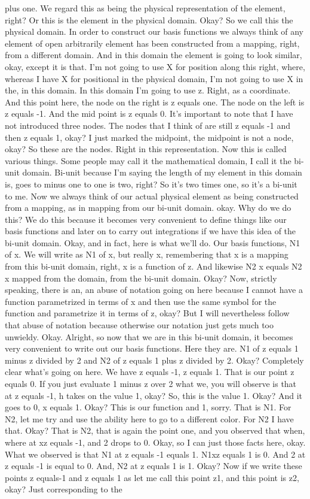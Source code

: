 \documentclass[10pt]{article}
\begin{document}
plus one. We regard this as being the physical representation of the element, right? Or this is the element in the physical domain. Okay? So we call this the physical domain. In order to construct our basis functions we always think of any element of open arbitrarily element has been constructed from a mapping, right, from a different domain. And in this domain the element is going to look similar, okay, except it is that. I'm not going to use X for position along this right, where, whereas I have X for positional in the physical domain, I'm not going to use X in the, in this domain. In this domain I'm going to use z. Right, as a coordinate. And this point here, the node on the right is z equals one. The node on the left is z equals -1. And the mid point is z equals 0. It's important to note that I have not introduced three nodes. The nodes that I think of are still z equals -1 and then z equals 1, okay? I just marked the midpoint, the midpoint is not a node, okay? So these are the nodes. Right in this representation. Now this is called various things. Some people may call it the mathematical domain, I call it the bi-unit domain. Bi-unit because I'm saying the length of my element in this domain is, goes to minus one to one is two, right? So it's two times one, so it's a bi-unit to me. Now we always think of our actual physical element as being constructed from a mapping, as in mapping from our bi-unit domain. okay. Why do we do this? We do this because it becomes very convenient to define things like our basis functions and later on to carry out integrations if we have this idea of the bi-unit domain. Okay, and in fact, here is what we'll do. Our basis functions, N1 of x. We will write as N1 of x, but really x, remembering that x is a mapping from this bi-unit domain, right, x is a function of z. And likewise N2 x equals N2 x mapped from the domain, from the bi-unit domain. Okay? Now, strictly speaking, there is an, an abuse of notation going on here because I cannot have a function parametrized in terms of x and then use the same symbol for the function and parametrize it in terms of z, okay? But I will nevertheless follow that abuse of notation because otherwise our notation just gets much too unwieldy. Okay. Alright, so now that we are in this bi-unit domain, it becomes very convenient to write out our basis functions. Here they are. N1 of z equals 1 minus z divided by 2 and N2 of z equals 1 plus z divided by 2. Okay? Completely clear what's going on here. We have z equals -1, z equals 1. That is our point z equals 0. If you just evaluate 1 minus z over 2 what we, you will observe is that at z equals -1, h takes on the value 1, okay? So, this is the value 1. Okay? And it goes to 0, x equals 1. Okay? This is our function and 1, sorry. That is N1. For N2, let me try and use the ability here to go to a different color. For N2 I have that. Okay? That is N2, that is again the point one, and you observed that when, where at xz equals -1, and 2 drops to 0. Okay, so I can just those facts here, okay. What we observed is that N1 at z equals -1 equals 1. N1xz equals 1 is 0. And 2 at z equals -1 is equal to 0. And, N2 at z equals 1 is 1. Okay? Now if we write these points z equals-1 and z equals 1 as let me call this point z1, and this point is z2, okay? Just corresponding to the 
\end{document}
